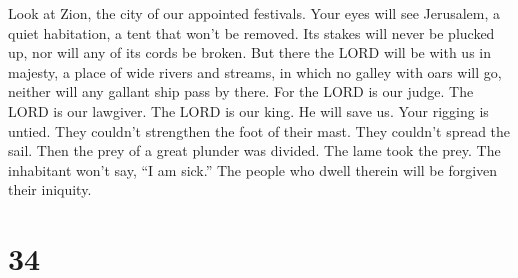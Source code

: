  Look at Zion, the city of our appointed festivals. Your
eyes will see Jerusalem, a quiet habitation, a tent that won't be
removed. Its stakes will never be plucked up, nor will any of its cords
be broken.  But there the LORD will be with us in majesty,
a place of wide rivers and streams, in which no galley with oars will
go, neither will any gallant ship pass by there.  For the
LORD is our judge. The LORD is our lawgiver. The LORD is our king. He
will save us.  Your rigging is untied. They couldn't
strengthen the foot of their mast. They couldn't spread the sail. Then
the prey of a great plunder was divided. The lame took the prey.
 The inhabitant won't say, ``I am sick.'' The people who
dwell therein will be forgiven their iniquity.

\hypertarget{section-33}{%
\section{34}\label{section-33}}

